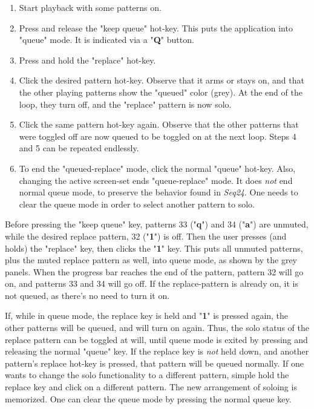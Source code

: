    \begin{enumerate}
      \item Start playback with some patterns on. 
      \item Press and release
         the "keep queue" hot-key.  This puts the application into "queue" mode.
         It is indicated via a "\textbf{Q}" button.
      \item Press and hold the "replace" hot-key.
      \item Click the desired pattern hot-key.  Observe that it arms or
         stays on, and that the other playing patterns show the "queued" color
         (grey).  At the end of the loop, they turn off, and the "replace"
         pattern is now solo.
      \item Click the same pattern hot-key again.  Observe that the other
         patterns that were toggled off are now queued to be toggled on at the
         next loop.  Steps 4 and 5 can be repeated endlessly.
      \item To end
         the "queued-replace" mode, click the normal "queue"
         hot-key.  Also, changing the active screen-set ends "queue-replace"
         mode.  It does \textsl{not} end normal queue mode, to preserve the
         behavior found in \textsl{Seq24}.
         One needs to clear the queue mode in order to select another pattern
         to solo.
   \end{enumerate}

   Before pressing the "keep queue" key, patterns 33 ("\textbf{q}")
   and 34 ("\textbf{a}") are
   unmuted, while the desired replace pattern, 32 ("\textbf{1}") is off.
   Then the user presses (and holds) the "replace" key, then clicks the
   "\textbf{1}" key.
   This puts all unmuted patterns, plus the muted
   replace pattern as well, into queue mode, as shown by the grey panels.
   When the progress bar reaches the end of the pattern, pattern 32 will go on,
   and patterns 33 and 34 will go off.
   If the replace-pattern is already on, it is not queued, as
   there's no need to turn it on.

   If, while in queue mode, the replace key is held and
   "\textbf{1}" is pressed again,
   the other patterns will be queued, and will turn on again.  Thus, the
   solo status of the replace pattern can be toggled at will, until queue mode
   is exited by pressing and releasing the normal "queue" key.
   If the replace key is \textsl{not} held down, and another pattern's replace
   hot-key is pressed, that pattern will be queued normally.
   If one wants to change the solo functionality to a different pattern,
   simple hold the replace key and click on a different pattern.  The new
   arrangement of soloing is memorized.
   One can clear the queue mode by pressing the normal queue key.

